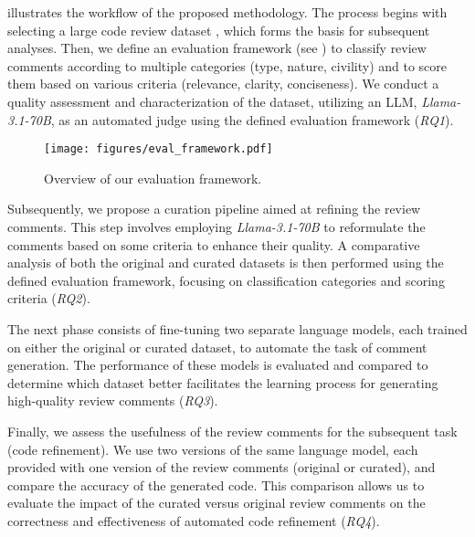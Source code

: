  illustrates the workflow of the proposed methodology. 
The process begins with selecting a large code review dataset \cite{li2022automating}, which forms the basis for subsequent analyses.
Then, we define an evaluation framework (see ) to classify review comments according to multiple categories (\ie type, nature, civility) and to score them based on various criteria (\ie relevance, clarity, conciseness). We conduct a quality assessment and characterization of the dataset, utilizing an LLM, \emph{Llama-3.1-70B}, as an automated judge using the defined evaluation framework (\emph{RQ1}).

\begin{figure}[!t]
    \centering
    \texttt{[image: figures/eval\_framework.pdf]}
    \caption{Overview of our evaluation framework.}
    \label{fig:eval_framework}
\end{figure}

Subsequently, we propose a curation pipeline aimed at refining the review comments. This step involves employing \emph{Llama-3.1-70B} to reformulate the comments based on some criteria to enhance their quality. A comparative analysis of both the original and curated datasets is then performed using the defined evaluation framework, focusing on classification categories and scoring criteria (\emph{RQ2}).


The next phase consists of fine-tuning two separate language models, each trained on either the original or curated dataset, to automate the task of comment generation. The performance of these models is evaluated and compared to determine which dataset better facilitates the learning process for generating high-quality review comments (\emph{RQ3}).


Finally, we assess the usefulness of the review comments for the subsequent task (\ie code refinement). We use two versions of the same language model, each provided with one version of the review comments (\ie original or curated), and compare the accuracy of the generated code. This comparison allows us to evaluate the impact of the curated versus original review comments on the correctness and effectiveness of automated code refinement (\emph{RQ4}).




